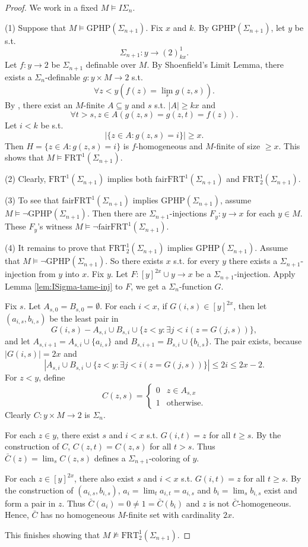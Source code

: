 \documentclass[twoside,a4paper]{amsart}
\theoremstyle{definition}
\theoremstyle{theorem}
\numberwithin{equation}{section}
\newcommand{\<}{\langle}
\renewcommand{\>}{\rangle}
\newcommand{\GPHP}{\mathrm{GPHP}}
\newcommand{\FRT}{\mathrm{FRT}}
\newcommand{\fairFRT}{\mathrm{fairFRT}}
\begin{document}
\begin{proof}
We work in a fixed $M \models I\Sigma_n$.

(1)
Suppose that $M \models \GPHP(\Sigma_{n+1})$.
Fix $x$ and $k$. 
By $\GPHP(\Sigma_{n+1})$, let $y$ be s.t.
\[
  \Sigma_{n+1}: y \to (2)^1_{kx}.
\]
Let $f: y \to 2$ be $\Sigma_{n+1}$ definable over $M$.
By Shoenfield's Limit Lemma, there exists a $\Sigma_n$-definable $g: y \times M \to 2$ s.t.
\[
  \forall z < y (f(z) = \lim_s g(z,s)).
\]
By \cite[Lemma 2.4]{BCWWY:2021}, there exist an $M$-finite $A \subseteq y$ and $s$ s.t.
$|A| \geq kx$ and 
\[
  \forall t > s, z \in A(g(z,s) = g(z,t) = f(z)).
\]
Let $i < k$ be s.t.
\[
  |\{z \in A: g(z,s) = i\}| \geq x.
\]
Then $H = \{z \in A: g(z,s) = i\}$ is $f$-homogeneous and $M$-finite of size $\geq x$. This shows that $M \models \FRT^1(\Sigma_{n+1})$.

(2)
Clearly, $\FRT^1(\Sigma_{n+1})$ implies both $\fairFRT^1(\Sigma_{n+1})$ and $\FRT^1_2(\Sigma_{n+1})$.

(3)
To see that $\fairFRT^1(\Sigma_{n+1})$ implies $\GPHP(\Sigma_{n+1})$,
assume $M \models \neg \GPHP(\Sigma_{n+1})$.
Then there are $\Sigma_{n+1}$-injections $F_y: y \to x$ for each $y \in M$.
These $F_y$'s witness $M \models \neg \fairFRT^1(\Sigma_{n+1})$.

(4)
It remains to prove that $\FRT^1_2(\Sigma_{n+1})$ implies $\GPHP(\Sigma_{n+1})$.
Assume that $M \models \neg \GPHP(\Sigma_{n+1})$.
So there exists $x$ 
 s.t. for every $y$ there exists a $\Sigma_{n+1}$-injection from $y$ into $x$.
Fix $y$.
Let $F: [y]^{2x} \cup y \to x$ be a $\Sigma_{n+1}$-injection.
Apply Lemma \ref{lem:ISigma-tame-inj} to $F$, we get a $\Sigma_n$-function $G$.

Fix $s$.
Let $A_{s,0} = B_{s,0} = \emptyset$.
For each $i < x$, if $G(i,s) \in [y]^{2x}$, then let $(a_{i,s},b_{i,s})$ be the least pair in 
\[
  G(i,s) - A_{s,i} \cup B_{s,i} \cup \{z < y: \exists j < i (z = G(j,s))\},
\]
and let $A_{s,i+1} = A_{s,i} \cup \{a_{i,s}\}$ and $B_{s,i+1} = B_{s,i} \cup \{b_{i,s}\}$.
The pair exists, because $|G(i,s)| = 2x$ and
\[
  |A_{s,i} \cup B_{s,i} \cup \{z < y: \exists j < i (z = G(j,s))\}| \leq 2i \leq 2x-2.
\]
For $z < y$, define
\[
  C(z,s) = 
  \begin{cases}
    0 & z \in A_{s,x} \\
    1 & \text{otherwise.}
  \end{cases}
\]
Clearly $C: y \times M \to 2$ is $\Sigma_n$.

For each $z \in y$, there exist $s$ and $i < x$ s.t. $G(i,t) = z$ for all $t \geq s$.
By the construction of $C$, $C(z,t) = C(z,s)$ for all $t > s$.
Thus $\bar{C}(z) = \lim_s C(z,s)$ defines a $\Sigma_{n+1}$-coloring of $y$. 

For each $z \in [y]^{2x}$, there also exist $s$ and $i < x$ s.t. $G(i,t) = z$ for all $t \geq s$.
By the construction of $(a_{i,s},b_{i,s})$, $a_i = \lim_t a_{i,t} = a_{i,s}$ and $b_i = \lim_s b_{i,s}$ exist and form a pair in $z$.
Thus $\bar{C}(a_i) = 0 \neq 1 = \bar{C}(b_i)$ and $z$ is not $\bar{C}$-homogeneous.
Hence, $\bar{C}$ has no homogeneous $M$-finite set with cardinality $2x$.

This finishes showing that $M \not\models \FRT^1_2(\Sigma_{n+1})$.
\end{proof}
\end{document}

